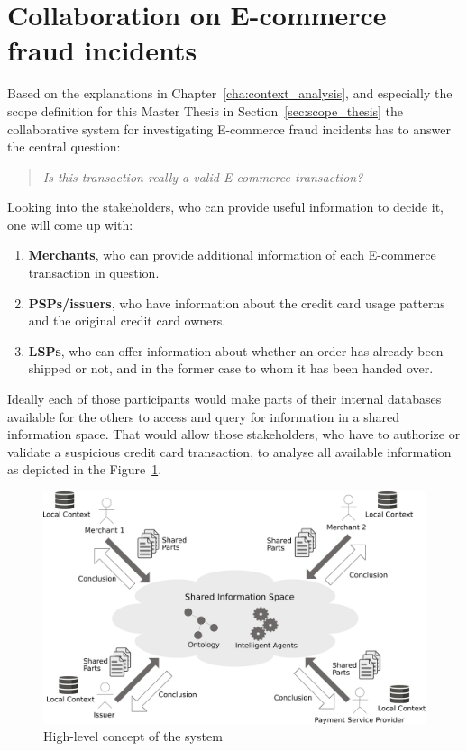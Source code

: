 
\section{Collaboration on \gls{E-commerce} fraud incidents}
\label{sec:concept_overview}

Based on the explanations in Chapter~\ref{cha:context_analysis}, and especially the scope definition for this Master Thesis in Section~\ref{sec:scope_thesis} the collaborative system for investigating \gls{E-commerce} fraud incidents has to answer the central question:\@

\begin{quotation}
  \textit{Is this transaction really a valid \gls{E-commerce} transaction?}
\end{quotation}

Looking into the stakeholders, who can provide useful information to decide it, one will come up with:\@

\begin{enumerate}
    \item \textbf{Merchants}, who can provide additional information of each \gls{E-commerce} transaction in question.
    \item \textbf{\gls{PSP}s/issuers}, who have information about the credit card usage patterns and the original credit card owners.
    \item \textbf{\gls{LSP}s}, who can offer information about whether an order has already been shipped or not, and in the former case to whom it has been handed over.
\end{enumerate}

Ideally each of those participants would make parts of their internal databases available for the others to access and query for information in a shared information space. That would allow those stakeholders, who have to authorize or validate a suspicious credit card transaction, to analyse all available information as depicted in the Figure~\ref{fig:images_system_overview}.\@

\begin{figure}[H]
	\centering
		\includegraphics[width=0.9\columnwidth]{images/system_overview.pdf}
	\caption{High-level concept of the system}
\label{fig:images_system_overview}
\end{figure}

